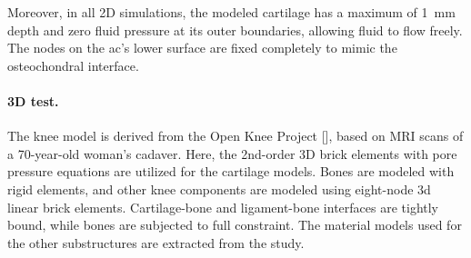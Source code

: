 \documentclass[12pt,a4paper]{report}
\begin{document}
Moreover, in all 2D simulations, the modeled cartilage has a maximum of 1~mm depth and zero fluid pressure at its outer boundaries, allowing fluid to flow freely. The nodes on the \ac{ac}'s lower surface are fixed completely to mimic the osteochondral interface.

\paragraph{3D test.} The knee model is derived from the Open Knee Project [\cite{erdemir2016}], based on MRI scans of a 70-year-old woman's cadaver. Here, the 2nd-order 3D brick elements with pore pressure equations are utilized for the cartilage models. Bones are modeled with rigid elements, and other knee components are modeled using eight-node \ac{3d} linear brick elements. Cartilage-bone and ligament-bone interfaces are tightly bound, while bones are subjected to full constraint. The material models used for the other substructures are extracted from the \cite{shim2016} study.
\end{document}
